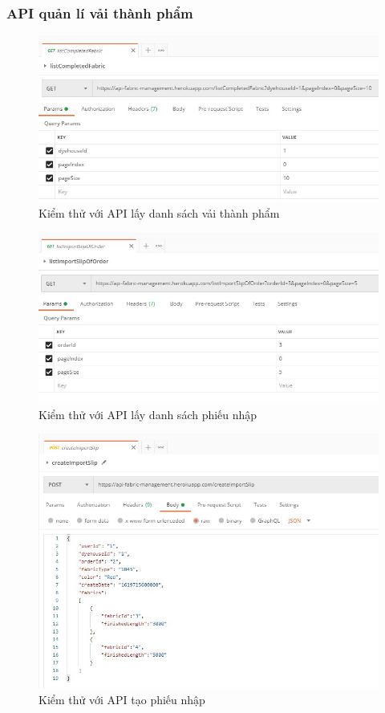 \subsubsection{API quản lí vải thành phẩm}
\begin{figure}[H]
    \begin{center}
        \includegraphics[width=12cm]{Image/API/24_listCompletedFabric.jpg}
        \caption{Kiểm thử với API lấy danh sách vải thành phẩm}
        \label{listCompletedFabric}
    \end{center}
\end{figure}
\begin{figure}[H]
    \begin{center}
        \includegraphics[width=12cm]{Image/API/25_listImportSlip.jpg}
        \caption{Kiểm thử với API lấy danh sách phiếu nhập}
        \label{listImportSlip}
    \end{center}
\end{figure}
\begin{figure}[H]
    \begin{center}
        \includegraphics[width=12cm]{Image/API/26_createImportSlip.jpg}
        \caption{Kiểm thử với API tạo phiếu nhập}
        \label{createImportSlip}
    \end{center}
\end{figure}
